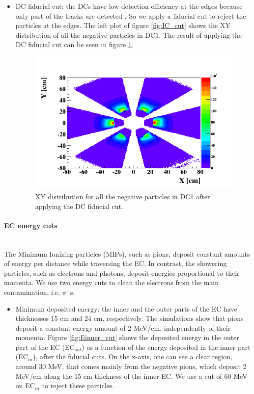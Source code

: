 \begin{itemize}
\begin{itemize}
\item DC fiducial cut: the DCs have low detection efficiency at the edges because only part of the tracks are detected \cite{DCref}. So we apply a fiducial cut to reject the particles at the edges. The left plot of figure \ref{fig:IC_cut} shows the XY distribution of all the negative particles in DC1. The result of applying the DC fiducial cut can be seen in figure \ref{fig:DC_cut}.  
\begin{figure}[tbp]
\centering
\includegraphics[scale=0.35]{fig_analysis/DC_el_2.png}
\caption{ XY distribution for all the negative particles in DC1 after applying the DC fiducial cut.} 
\label{fig:DC_cut}
\end{figure}

\end{itemize}

\paragraph{EC energy cuts} ~\\
The Minimum Ionizing particles (MIPs), such as pions, deposit constant 
amounts of energy per distance while traversing the EC.  In contrast, the 
showering particles, such as electrons and photons, deposit energies 
proportional to their momenta. We use two energy cuts to clean the electrons 
from the main contamination, i.e.  $\pi^{-}$s.
\begin{itemize}
\item Minimum deposited energy:
   the inner and the outer parts of the EC have thicknesses 15 cm and 24 cm, 
   respectively. The simulations show that pions deposit a constant energy 
   amount of 2 MeV/cm, independently of their momenta. Figure 
   \ref{fig:Einner_cut} shows the deposited energy in the outer part of the EC 
   (EC$_{out}$) as a function of the energy deposited in the inner part 
   (EC$_{in}$), after the fiducial cuts. On the x-axis, one can see a clear 
   region, around 30 MeV, that comes mainly from the negative pions, which 
   deposit 2 MeV/cm along the 15 cm thickness of the inner EC. We use a cut of 
   60 MeV on EC$_{in}$ to reject these particles. 
   

\end{itemize}
\end{itemize}

